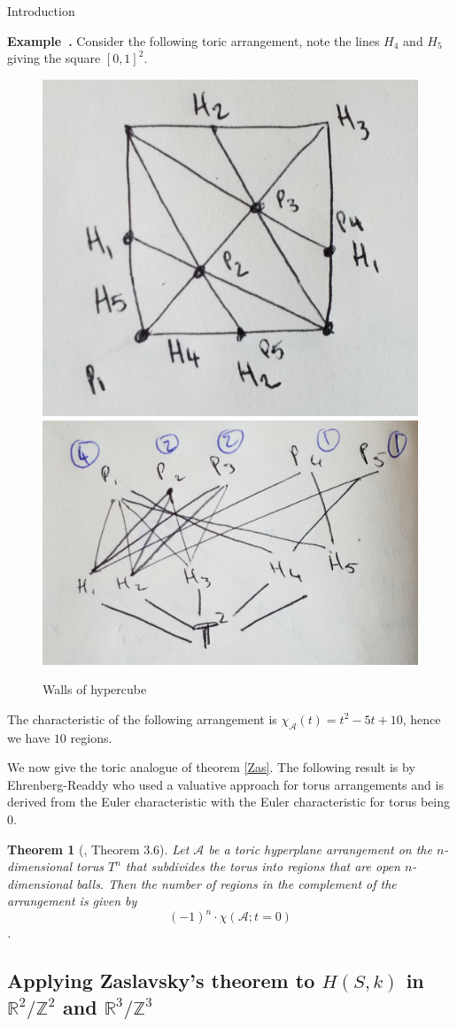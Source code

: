 \documentclass[a4paper,12pt]{article}
\newcounter{example}[]
\newenvironment{example}[1][]{\refstepcounter{example}\par\medskip
   \noindent \textbf{Example~\theexample. #1} \rmfamily}{\medskip}
\newtheorem{theorem}{Theorem}[section]
\theoremstyle{definition}
\theoremstyle{indented}
\begin{document}
\begin{section}{Introduction}
\begin{example} Consider the following toric arrangement, note the lines $H_4$ and $H_5$ giving the square $[0,1]^2$. 
\begin{figure}[H]
    \centering
 \includegraphics[width=.36\textwidth,angle=0]{29072020 pics/torichyperwalls.jpg}\qquad \qquad 
 \includegraphics[width=.5\textwidth,angle=0]{29072020 pics/torichyperwall2.jpg}  
    \caption{Walls of hypercube}
    \label{}
\end{figure}

The characteristic of the following arrangement is $\chi_{\mathcal{A}} (t)=t^2 -5t+10$, hence we have $10$ regions.
\end{example}

We now give the toric analogue of theorem \ref{Zas}. The following result is by Ehrenberg-Readdy who used a valuative approach for torus arrangements and is derived from the Euler characteristic with the Euler characteristic for torus being $0$.


\begin{theorem}[\cite{Ehrenborg2008AffineArrangements}, Theorem 3.6]\label{readdy}
Let $\mathcal{A}$ be a toric hyperplane arrangement on the $n$-dimensional torus $T^n$
that subdivides the torus into regions that are open $n$-dimensional balls. Then the number of regions in the complement of the arrangement is given by 
$$(-1)^{n} \cdot \chi(\mathcal{A};t = 0)$$.
\end{theorem}


\subsection{Applying Zaslavsky's theorem to $H(S,k)$ in $\mathbb{R}^2/\mathbb{Z}^2$ and $\mathbb{R}^3/\mathbb{Z}^3$}


\end{section}
\end{document}
